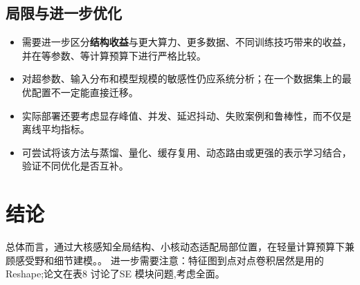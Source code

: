 \documentclass[UTF8,11pt,a4paper]{ctexart}
\newcommand{\term}[1]{\textbf{\textcolor{mainblue}{#1}}}
\begin{document}
\subsection{局限与进一步优化}
\begin{itemize}
\item 需要进一步区分\term{结构收益}与更大算力、更多数据、不同训练技巧带来的收益，并在等参数、等计算预算下进行严格比较。
\item 对超参数、输入分布和模型规模的敏感性仍应系统分析；在一个数据集上的最优配置不一定能直接迁移。
\item 实际部署还要考虑显存峰值、并发、延迟抖动、失败案例和鲁棒性，而不仅是离线平均指标。
\item 可尝试将该方法与蒸馏、量化、缓存复用、动态路由或更强的表示学习结合，验证不同优化是否互补。
\end{itemize}

\section{结论}
总体而言，通过大核感知全局结构、小核动态适配局部位置，在轻量计算预算下兼顾感受野和细节建模。。 进一步需要注意：特征图到点对点卷积居然是用的Reshape;论文在表8 讨论了SE 模块问题,考虑全面。
\end{document}
